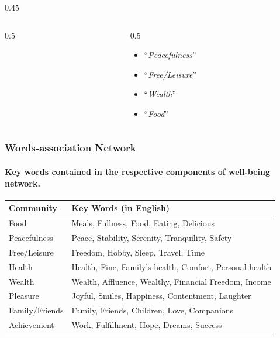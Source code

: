 \documentclass[
	aspectratio=169, %
	t, %
	onlytextwidth, %
	10pt, %
]{beamer}
\begin{document}
\begin{frame}
\begin{columns}[T]
\begin{column}{0.45\linewidth}
\begin{itemize}
\begin{columns}
\begin{column}{0.5\linewidth}
\begin{itemize}
                            \end{itemize}
                        \end{column}
                        \begin{column}{0.5\linewidth}
                            \begin{itemize}
                                \item “\textit{Peacefulness}”
                                \item “\textit{Free/Leisure}”
                                \item “\textit{Wealth}”
                                \item “\textit{Food}”
                            \end{itemize}
                        \end{column}
                    \end{columns}
                \end{itemize}
		\end{column}
	\end{columns}
\end{frame}

\begin{frame}
    \frametitle{Words-association Network}
    \framesubtitle{Key words contained in the respective components of well-being network.}
    \vspace{1cm}
    \begin{table}
     \begin{center}
     \begin{tabular}{@{}ll@{}}
     \toprule
Community & Key Words (in English)\\
\midrule
Food & Meals, Fullness, Food, Eating, Delicious \\
Peacefulness & Peace, Stability, Serenity, Tranquility, Safety \\
Free/Leisure & Freedom, Hobby, Sleep, Travel, Time \\
Health & Health, Fine, Family's health, Comfort, Personal health \\
Wealth & Wealth, Affluence, Wealthy, Financial Freedom, Income \\
Pleasure & Joyful, Smiles, Happiness, Contentment, Laughter \\
Family/Friends & Family, Friends, Children, Love, Companions \\
Achievement & Work, Fulfillment, Hope, Dreams, Success \\
\bottomrule
\end{tabular}
\end{center}
\end{table}
    
\end{frame}
\end{document}
